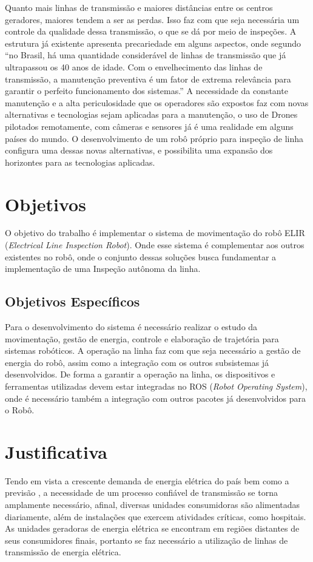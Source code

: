 Quanto mais linhas de transmissão e maiores distâncias entre os centros geradores, maiores tendem a ser as perdas. Isso faz com que seja necessária um controle da qualidade dessa transmissão, o que se dá por meio de inspeções. A estrutura já existente apresenta precariedade em alguns aspectos, onde segundo \cite{rangel2009sistema} “no Brasil, há uma quantidade considerável de linhas de transmissão que já ultrapassou os 40 anos de idade. Com o envelhecimento das linhas de transmissão, a manutenção preventiva é um fator de extrema relevância para garantir o perfeito funcionamento dos sistemas.”
A necessidade da constante manutenção e a alta periculosidade que os operadores são expostos faz com novas alternativas e tecnologias sejam aplicadas para a manutenção, o uso de Drones pilotados remotamente, com câmeras e sensores já é uma realidade em alguns países do mundo. O desenvolvimento de um robô próprio para inspeção de linha configura uma dessas novas alternativas, e possibilita uma expansão dos horizontes para as tecnologias aplicadas.
\section{Objetivos}
\label{sec:obj}
O objetivo do trabalho é implementar o sistema de movimentação do robô ELIR (\textit{Electrical Line Inspection Robot}). Onde esse sistema é complementar aos outros existentes no robô, onde o conjunto dessas soluções busca fundamentar a implementação de uma Inspeção autônoma da linha.


\subsection{Objetivos Específicos}
\label{ssec:objesp}
Para o desenvolvimento do sistema é necessário realizar o estudo da movimentação, gestão de energia, controle e elaboração de trajetória para sistemas robóticos. A operação na linha faz com que seja necessário a gestão de energia do robô, assim como a integração com os outros subsistemas já desenvolvidos. De forma a garantir a operação na linha, os dispositivos e ferramentas utilizadas devem estar integradas no ROS (\textit{Robot Operating System}), onde é necessário também a integração com outros pacotes já desenvolvidos para o Robô.

\section{Justificativa}
\label{sec:justi}
 Tendo em vista a crescente demanda de energia elétrica do país bem como a previsão , a necessidade de um processo confiável de transmissão se torna amplamente necessário, afinal, diversas unidades consumidoras são alimentadas diariamente, além de instalações que exercem atividades críticas, como hospitais. As unidades geradoras de energia elétrica se encontram em regiões distantes de seus consumidores finais, portanto se faz necessário a utilização de linhas de transmissão de energia elétrica. 
 
